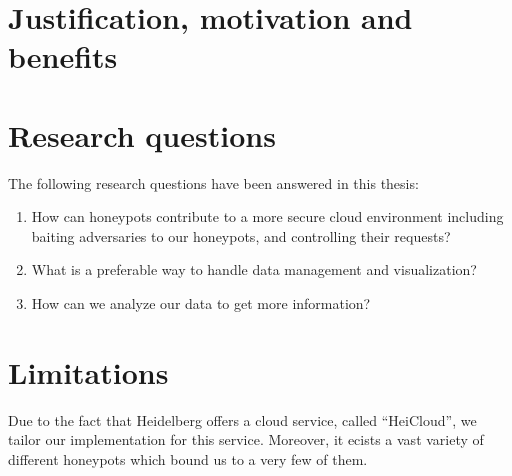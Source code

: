 \section{Justification, motivation and benefits}


\section{Research questions}

The following research questions have been answered in this thesis:

\begin{enumerate}
    \item How can honeypots contribute to a more secure cloud environment including baiting adversaries to our honeypots, and controlling their requests?
    \item What is a preferable way to handle data management and visualization?
    \item How can we analyze our data to get more information?
\end{enumerate}

\section{Limitations}

Due to the fact that Heidelberg offers a cloud service, called
\enquote{HeiCloud}, we tailor our implementation for this service. Moreover, it ecists a vast variety of different honeypots which bound us to a very few of them. 